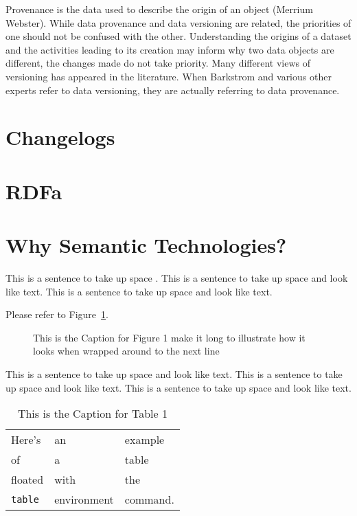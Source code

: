 Provenance is the data used to describe the origin of an object (Merrium Webster).  While data provenance and data versioning are related, the priorities of one should not be confused with the other.  Understanding the origins of a dataset and the activities leading to its creation may inform why two data objects are different, the changes made do not take priority.  Many different views of versioning has appeared in the literature.  When Barkstrom and various other experts refer to data versioning, they are actually referring to data provenance.

\section{Changelogs}

\section{RDFa}

\section{Why Semantic Technologies?}

This is a sentence to take up space \cite{thisbook}.
This is a sentence to take up space and look like text.
This is a sentence to take up space and look like text.

Please refer to Figure~\ref{myfig}.  %

\begin{figure}
\centering
\vspace{2.0in} %
\caption{This is the Caption for Figure 1 make it long to illustrate
how it looks when wrapped around to the next line}
\label{myfig}  %
\end{figure}

This is a sentence to take up space and look like text.
This is a sentence to take up space and look like text.
This is a sentence to take up space and look like text.

\begin{table}
\caption[This is the Caption for Table 1]
            {This is the Caption for Table 1\cite{thisbook}}
\begin{center}
\begin{tabular}{lll}
Here's       & an          & example  \\
of           & a           & table    \\
floated      & with        & the      \\
\verb+table+ & environment & command.
\end{tabular}
\end{center}
\end{table}

